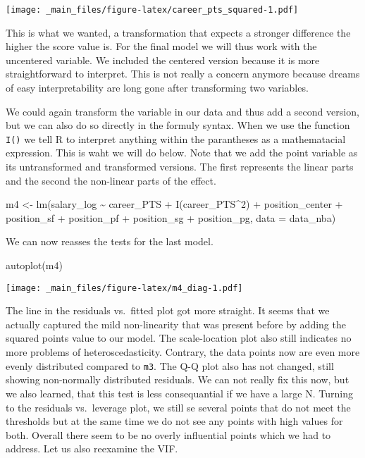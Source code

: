 \documentclass[
]{book}
\newenvironment{Shaded}{\begin{snugshade}}{\end{snugshade}}
\newcommand{\AttributeTok}[1]{\textcolor[rgb]{0.77,0.63,0.00}{#1}}
\newcommand{\DecValTok}[1]{\textcolor[rgb]{0.00,0.00,0.81}{#1}}
\newcommand{\FunctionTok}[1]{\textcolor[rgb]{0.00,0.00,0.00}{#1}}
\newcommand{\NormalTok}[1]{#1}
\newcommand{\OtherTok}[1]{\textcolor[rgb]{0.56,0.35,0.01}{#1}}
\newcommand{\SpecialCharTok}[1]{\textcolor[rgb]{0.00,0.00,0.00}{#1}}
\begin{document}
\texttt{[image: \_main\_files/figure-latex/career\_pts\_squared-1.pdf]}

This is what we wanted, a transformation that expects a stronger difference the
higher the score value is. For the final model we will thus work with the
uncentered variable. We included the centered version because it is more
straightforward to interpret. This is not really a concern anymore because
dreams of easy interpretability are long gone after transforming two variables.

We could again transform the variable in our data and thus add a second version,
but we can also do so directly in the formuly syntax. When we use the function
\texttt{I()} we tell R to interpret anything within the parantheses as a mathematacial
expression. This is waht we will do below. Note that we add the point variable
as its untransformed and transformed versions. The first represents the linear
parts and the second the non-linear parts of the effect.

\begin{Shaded}
\begin{Highlighting}[]
\NormalTok{m4 }\OtherTok{\textless{}{-}} \FunctionTok{lm}\NormalTok{(salary\_log }\SpecialCharTok{\textasciitilde{}}\NormalTok{ career\_PTS }\SpecialCharTok{+} \FunctionTok{I}\NormalTok{(career\_PTS}\SpecialCharTok{\^{}}\DecValTok{2}\NormalTok{) }\SpecialCharTok{+}\NormalTok{ position\_center }\SpecialCharTok{+}\NormalTok{ position\_sf }\SpecialCharTok{+}\NormalTok{ position\_pf }\SpecialCharTok{+}\NormalTok{ position\_sg }\SpecialCharTok{+}\NormalTok{ position\_pg, }\AttributeTok{data =}\NormalTok{ data\_nba)}
\end{Highlighting}
\end{Shaded}

We can now reasses the tests for the last model.

\begin{Shaded}
\begin{Highlighting}[]
\FunctionTok{autoplot}\NormalTok{(m4)}
\end{Highlighting}
\end{Shaded}

\texttt{[image: \_main\_files/figure-latex/m4\_diag-1.pdf]}

The line in the residuals vs.~fitted plot got more straight. It seems that we
actually captured the mild non-linearity that was present before by adding the
squared points value to our model. The scale-location plot also still indicates
no more problems of heteroscedasticity. Contrary, the data points now are even
more evenly distributed compared to \texttt{m3}. The Q-Q plot also has not changed,
still showing non-normally distributed residuals. We can not really fix this
now, but we also learned, that this test is less consequantial if we have a
large N. Turning to the residuals vs.~leverage plot, we still se several points
that do not meet the thresholds but at the same time we do not see any points
with high values for both. Overall there seem to be no overly influential points
which we had to address. Let us also reexamine the VIF.
\end{document}
